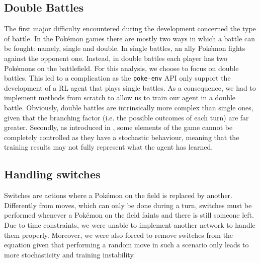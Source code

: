 \subsection{Double Battles}
The first major difficulty encountered during the development concerned the type of battle. In the Pokémon games there are mostly two ways in which a battle can be fought: namely, single and double. In single battles, an ally Pokémon fights against the opponent one. Instead, in double battles each player has two Pokémons on the battlefield. For this analysis, we choose to focus on double battles. This led to a complication as the \texttt{poke-env} API only support the development of a RL agent that plays single battles. As a consequence, we had to implement methods from scratch to allow us to train our agent in a double battle. Obviously, double battles are intrinsically more complex than single ones, given that the branching factor (i.e. the possible outcomes of each turn) are far greater. 
Secondly, as introduced in , some elements of the game cannot be completely controlled as they have a stochastic behaviour, meaning that the training results may not fully represent what the agent has learned.

\subsection{Handling switches}
Switches are actions where a Pokémon on the field is replaced by another. Differently from moves, which can only be done during a turn, switches must be performed whenever a Pokémon on the field faints and there is still someone left. Due to time constraints, we were unable to implement another network to handle them properly. Moreover, we were also forced to remove switches from the equation given that performing a random move in such a scenario only leads to more stochasticity and training instability.

